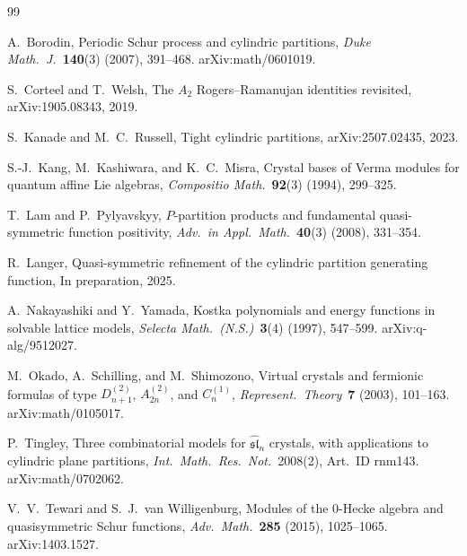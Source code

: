 \documentclass[11pt]{article}
\begin{document}

\begin{thebibliography}{99}

A.~Borodin,
Periodic Schur process and cylindric partitions,
\emph{Duke Math.\ J.}\ \textbf{140}(3) (2007), 391--468.
arXiv:math/0601019.

S.~Corteel and T.~Welsh,
The $A_2$ Rogers--Ramanujan identities revisited,
arXiv:1905.08343, 2019.

S.~Kanade and M.~C.~Russell,
Tight cylindric partitions,
arXiv:2507.02435, 2023.

S.-J.~Kang, M.~Kashiwara, and K.~C.~Misra,
Crystal bases of Verma modules for quantum affine Lie algebras,
\emph{Compositio Math.}\ \textbf{92}(3) (1994), 299--325.

T.~Lam and P.~Pylyavskyy,
$P$-partition products and fundamental quasi-symmetric function
positivity,
\emph{Adv.\ in Appl.\ Math.}\ \textbf{40}(3) (2008), 331--354.

R.~Langer,
Quasi-symmetric refinement of the cylindric partition
generating function,
In preparation, 2025.

A.~Nakayashiki and Y.~Yamada,
Kostka polynomials and energy functions in solvable lattice
models,
\emph{Selecta Math.\ (N.S.)}\ \textbf{3}(4) (1997), 547--599.
arXiv:q-alg/9512027.

M.~Okado, A.~Schilling, and M.~Shimozono,
Virtual crystals and fermionic formulas of type
$D^{(2)}_{n+1}$, $A^{(2)}_{2n}$, and $C^{(1)}_n$,
\emph{Represent.\ Theory}\ \textbf{7} (2003), 101--163.
arXiv:math/0105017.

P.~Tingley,
Three combinatorial models for $\widehat{\mathfrak{sl}}_n$
crystals, with applications to cylindric plane partitions,
\emph{Int.\ Math.\ Res.\ Not.}\ 2008(2), Art.~ID rnm143.
arXiv:math/0702062.

V.~V.~Tewari and S.~J.~van Willigenburg,
Modules of the $0$-Hecke algebra and quasisymmetric Schur
functions,
\emph{Adv.\ Math.}\ \textbf{285} (2015), 1025--1065.
arXiv:1403.1527.

\end{thebibliography}
\end{document}
